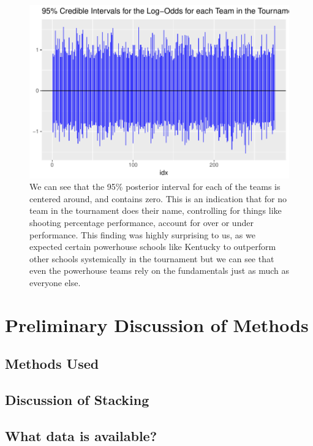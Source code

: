 \documentclass[10pt,a4paper, hidelinks]{article} %
\begin{document}
\begin{figure}[H]
	\centering
	\includegraphics[width=0.7\linewidth]{../fig/polr_team_log_odds}
	\caption{We can see that the 95\% posterior interval for each of the teams is centered around, and contains zero. This is an indication that for no team in the tournament does their name, controlling for things like shooting percentage performance, account for over or under performance. This finding was highly surprising to us, as we expected certain powerhouse schools like Kentucky to outperform other schools systemically in the tournament but we can see that even the powerhouse teams rely on the fundamentals just as much as everyone else.}
	\label{fig:polrteamlogodds}
\end{figure}


\section{Preliminary Discussion of Methods}

\subsection{Methods Used}
 \subsection{Discussion of Stacking}
\subsection{What data is available?}
\end{document}
